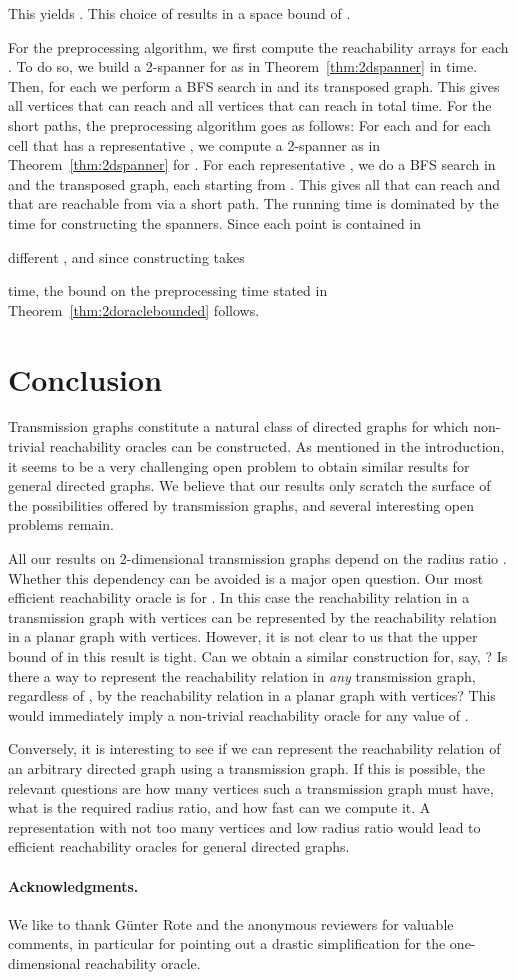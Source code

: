 \documentclass[11pt,a4paper]{paper}
\begin{document}
This yields .
This choice of  results in a space bound of
.

For the preprocessing algorithm, we first compute the reachability arrays
for each . To do so, we build a 2-spanner  for 
as in Theorem~\ref{thm:2dspanner} in   time.
Then,
for each  we perform a BFS search in  and its transposed graph.
This gives all vertices that  can reach and
all vertices that can reach 
in  total time.
For the short paths, the preprocessing algorithm goes as follows:
For each  and
for each cell  that has a representative ,
we compute a 2-spanner  as in Theorem~\ref{thm:2dspanner} for
.
For each representative , we do a BFS search in  and
the transposed graph, each starting from . This gives all
 that can reach 
and that are reachable from  via a short path.
The running time is dominated by the time for constructing the
spanners. Since each point  is contained in

different , and
since constructing  takes

time, the bound on the  preprocessing time stated in
Theorem~\ref{thm:2doraclebounded} follows.

\section{Conclusion}
Transmission graphs constitute a natural class of
directed graphs for which non-trivial reachability
oracles can be constructed. As mentioned in the
introduction, it seems to be a very challenging
open problem to obtain similar results for general directed
graphs.  We believe that our results only scratch
the surface of the possibilities offered by transmission graphs,
and several interesting open problems remain.

All our results on 2-dimensional transmission graphs depend on the radius ratio .
Whether this dependency can be avoided is a major open question.
Our most efficient reachability oracle is for . In this case
the reachability relation in a transmission graph with  vertices can be represented
by the reachability relation in a planar graph with  vertices.
However, it is not clear to us that the upper bound of  in this result is
tight.
Can we obtain a similar construction for, say, ? Is there
 a way to represent the reachability relation in \emph{any} transmission graph, regardless of ,
by the reachability relation in a planar graph with  vertices?
This would immediately imply a non-trivial reachability oracle for any value
of .

Conversely, it is interesting to see if we can represent
the reachability relation of an arbitrary directed graph
using a transmission graph. If this is possible, the relevant questions
are how many vertices such a transmission graph must have, what is the required
radius ratio, and how fast can we compute it. A representation with not too many
vertices and low radius ratio would lead to efficient reachability oracles for
general directed graphs.

\paragraph*{Acknowledgments.}
We like to thank G\"unter Rote and the anonymous reviewers 
for valuable comments, in particular for pointing out a
drastic simplification for the one-dimensional reachability oracle.



\end{document}
